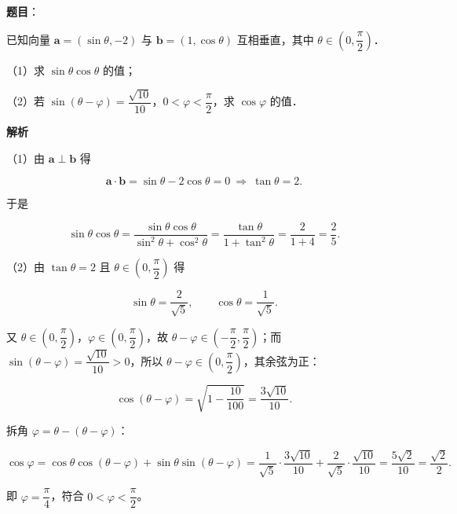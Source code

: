 \begin{answer}

\textbf{题目}：

已知向量 $\boldsymbol a=(\sin\theta,-2)$ 与 $\boldsymbol b=(1,\cos\theta)$ 互相垂直，其中 $\theta\in\left(0,\dfrac{\pi}{2}\right)$．

（1）求 $\sin\theta\cos\theta$ 的值；

（2）若 $\sin(\theta-\varphi)=\dfrac{\sqrt{10}}{10}$，$0<\varphi<\dfrac{\pi}{2}$，求 $\cos\varphi$ 的值．

\textbf{解析}

（1）由 $\boldsymbol a\perp\boldsymbol b$ 得

\nopagebreak[4]
\[\boldsymbol a\cdot\boldsymbol b=\sin\theta-2\cos\theta=0\ \Longrightarrow\ \tan\theta=2.\]

于是

\nopagebreak[4]
\[\sin\theta\cos\theta=\frac{\sin\theta\cos\theta}{\sin^2\theta+\cos^2\theta}=\frac{\tan\theta}{1+\tan^2\theta}=\frac2{1+4}=\frac25.\]

（2）由 $\tan\theta=2$ 且 $\theta\in\left(0,\dfrac{\pi}{2}\right)$ 得

\nopagebreak[4]
\[\sin\theta=\frac2{\sqrt5},\qquad \cos\theta=\frac1{\sqrt5}.\]

又 $\theta\in\left(0,\dfrac{\pi}{2}\right)$，$\varphi\in\left(0,\dfrac{\pi}{2}\right)$，故 $\theta-\varphi\in\left(-\dfrac{\pi}{2},\dfrac{\pi}{2}\right)$；而 $\sin(\theta-\varphi)=\dfrac{\sqrt{10}}{10}>0$，所以 $\theta-\varphi\in\left(0,\dfrac{\pi}{2}\right)$，其余弦为正：

\nopagebreak[4]
\[\cos(\theta-\varphi)=\sqrt{1-\frac{10}{100}}=\frac{3\sqrt{10}}{10}.\]

拆角 $\varphi=\theta-(\theta-\varphi)$：

\nopagebreak[4]
\[\cos\varphi=\cos\theta\cos(\theta-\varphi)+\sin\theta\sin(\theta-\varphi)=\frac1{\sqrt5}\cdot\frac{3\sqrt{10}}{10}+\frac2{\sqrt5}\cdot\frac{\sqrt{10}}{10}=\frac{5\sqrt2}{10}=\frac{\sqrt2}{2}.\]

即 $\varphi=\dfrac{\pi}{4}$，符合 $0<\varphi<\dfrac{\pi}{2}$。


\end{answer}
